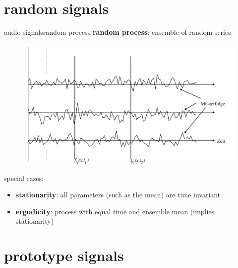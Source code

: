 \section{random signals}	
\begin{frame}{audio signals}{random process}
	\textbf{random process}: ensemble of random series
	\begin{figure}
		\centering
			\includegraphics[scale=.25]{graph/randomprocess}
	\end{figure}
	\pause
	special cases:
	\begin{itemize}
		\item	\textbf{stationarity}: all parameters (such as the mean) are time invariant
		\item	\textbf{ergodicity}: process with equal time and ensemble mean (implies stationarity)
	\end{itemize}
\end{frame}

\section{prototype signals}


